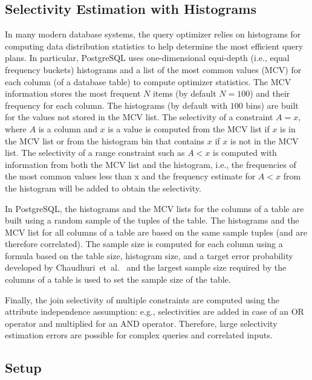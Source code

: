 \subsection{Selectivity Estimation with Histograms}\label{sec:selhist}
In many modern database systems, the query optimizer relies on
histograms for computing data distribution statistics to help determine the most
efficient query plans. In particular, PostgreSQL 
uses one-dimensional equi-depth (i.e., equal frequency buckets) histograms and a
list of the most common values (MCV) for each column (of a database table) to
compute optimizer statistics. The MCV information stores the most
frequent $N$ items (by default $N=100$) and their frequency for each column. The
histograms (by default with $100$ bins) are built for the values not stored in
the MCV list. The selectivity of a constraint $A=x$, where $A$ is a
column and $x$ is a value is computed from the MCV list if $x$ is in the MCV
list or from the histogram bin that contains $x$ if $x$ is not in the MCV list.
The selectivity of a range constraint such as $A<x$ is computed with information from both the MCV
list and the histogram, i.e., the
frequencies of the most common values less than x and the frequency estimate for
$A<x$ from the histogram will be added to obtain the selectivity.

In PostgreSQL, the histograms and the MCV lists for the
columns of a table are built using a random sample of the tuples of the table. The
histograms and the MCV list for all columns of a table are based on the same
sample tuples (and are therefore correlated).  The sample size is computed for
each column using a formula based on the table size, histogram size, and a
target error probability developed by Chaudhuri~et~al.~\citeyearpar{ChaudhuriMN98}  and the largest sample size required by
the columns of a table is used to set the sample size of the table. 

Finally, the join selectivity of multiple constraints are computed using
the attribute independence assumption: e.g., selectivities are added in case of an
OR operator and multiplied for an AND operator.  Therefore, large selectivity
estimation errors are possible for complex queries and correlated inputs. 

\subsection{Setup}

